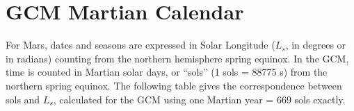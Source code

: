 \chapter{GCM Martian Calendar}

\label{sc:sol2ls}


For Mars, dates and seasons are expressed in Solar Longitude ($L_s$,
in degrees or in radians) counting from the northern hemisphere spring equinox.
In the GCM, time is counted in Martian solar days, or ``sols''
(1 sols = 88775 s) from the northern spring equinox. 
The following table gives the correspondence between sols and $L_s$,
calculated for the GCM using one Martian year = 669 sols exactly.

\vspace{0.5cm}

\footnotesize


